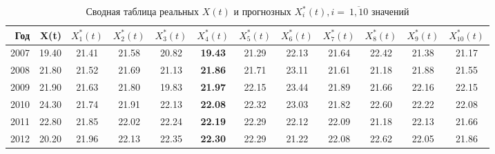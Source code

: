 \begin{table}[ht]
\centering
\caption{Сводная таблица реальных $ X(t)$ и прогнозных $ X_i^{*}(t), i=~\overline{1,10} $ значений} 
\label{table:summary-prediction}
{\footnotesize
\begin{tabular}{r|rcccccccccc}
  \hline
Год & X(t) & $ X^{*}_1(t) $ & $ X^{*}_2(t) $ & $ X^{*}_3(t) $ & \boldmath$ X^{*}_4(t) $ & $ X^{*}_5(t) $ & $ X^{*}_6(t) $ & $ X^{*}_7(t) $ & $ X^{*}_8(t) $ & $ X^{*}_9(t) $ & $ X^{*}_{10}(t) $ \\ 
  \hline
  2007 & 19.40 & 21.41 & 21.58 & 20.82 & \textbf{19.43} & 21.29 & 22.13 & 21.64 & 22.42 & 21.38 & 21.17 \\ 
  2008 & 21.80 & 21.52 & 21.69 & 21.13 & \textbf{21.86} & 21.71 & 23.11 & 21.61 & 21.18 & 21.88 & 21.55 \\ 
  2009 & 21.90 & 21.63 & 21.80 & 19.83 & \textbf{21.97} & 22.15 & 23.44 & 21.89 & 21.66 & 22.16 & 22.15 \\ 
  2010 & 24.30 & 21.74 & 21.91 & 22.13 & \textbf{22.08} & 22.32 & 23.03 & 21.82 & 22.60 & 22.22 & 22.08 \\ 
  2011 & 22.80 & 21.85 & 22.02 & 22.24 & \textbf{22.19} & 22.29 & 22.12 & 22.09 & 21.18 & 22.13 & 21.66 \\ 
  2012 & 20.20 & 21.96 & 22.13 & 22.35 & \textbf{22.30} & 22.29 & 21.22 & 22.08 & 22.62 & 22.05 & 21.86 \\ 
   \hline
\end{tabular}
}
\end{table}
